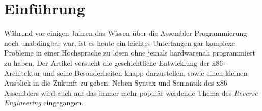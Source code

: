 \section{Einführung}
Während vor einigen Jahren das Wissen über die Assembler-Programmierung noch unabdingbar war, ist es heute ein leichtes Unterfangen gar komplexe Probleme in einer Hochsprache zu lösen ohne jemals hardwarenah programmiert zu haben.
Der Artikel versucht die geschichtliche Entwicklung der x86-Architektur und seine Besonderheiten knapp darzustellen, sowie einen kleinen Ausblick in die Zukunft zu geben.
Neben Syntax und Semantik des x86 Assemblers wird auch auf das immer mehr populär werdende Thema des \textit{Reverse Engineering} eingegangen.
